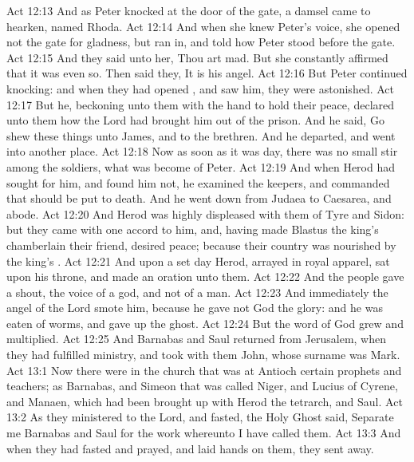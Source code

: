 \vs Act 12:13 And as Peter knocked at the door of the gate, a damsel came to hearken, named Rhoda.
\vs Act 12:14 And when she knew Peter's voice, she opened not the gate for gladness, but ran in, and told how Peter stood before the gate.
\vs Act 12:15 And they said unto her, Thou art mad. But she constantly affirmed that it was even so. Then said they, It is his angel.
\vs Act 12:16 But Peter continued knocking: and when they had opened , and saw him, they were astonished.
\vs Act 12:17 But he, beckoning unto them with the hand to hold their peace, declared unto them how the Lord had brought him out of the prison. And he said, Go shew these things unto James, and to the brethren. And he departed, and went into another place.
\vs Act 12:18 Now as soon as it was day, there was no small stir among the soldiers, what was become of Peter.
\vs Act 12:19 And when Herod had sought for him, and found him not, he examined the keepers, and commanded that  should be put to death. And he went down from Judaea to Caesarea, and  abode.
\vs Act 12:20 And Herod was highly displeased with them of Tyre and Sidon: but they came with one accord to him, and, having made Blastus the king's chamberlain their friend, desired peace; because their country was nourished by the king's .
\vs Act 12:21 And upon a set day Herod, arrayed in royal apparel, sat upon his throne, and made an oration unto them.
\vs Act 12:22 And the people gave a shout,  the voice of a god, and not of a man.
\vs Act 12:23 And immediately the angel of the Lord smote him, because he gave not God the glory: and he was eaten of worms, and gave up the ghost.
\vs Act 12:24 But the word of God grew and multiplied.
\vs Act 12:25 And Barnabas and Saul returned from Jerusalem, when they had fulfilled  ministry, and took with them John, whose surname was Mark.
\vs Act 13:1 Now there were in the church that was at Antioch certain prophets and teachers; as Barnabas, and Simeon that was called Niger, and Lucius of Cyrene, and Manaen, which had been brought up with Herod the tetrarch, and Saul.
\vs Act 13:2 As they ministered to the Lord, and fasted, the Holy Ghost said, Separate me Barnabas and Saul for the work whereunto I have called them.
\vs Act 13:3 And when they had fasted and prayed, and laid  hands on them, they sent  away.
